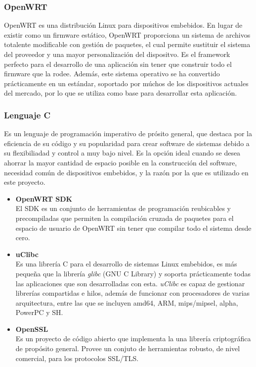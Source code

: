 \documentclass[12pt]{article}
\begin{document}
        \subsubsection{OpenWRT}
            OpenWRT es una distribución Linux para dispositivos embebidos. En lugar de existir como un firmware estático, OpenWRT proporciona un sistema de archivos totalente modificable con gestión de paquetes, el cual permite sustituir el sistema del proveedor y una mayor personalización del dispositvo. Es el framework perfecto para el desarrollo de una aplicación sin tener que construir todo el firmware que la rodee. Además, este sistema operativo se ha convertido prácticamente en un estándar, soportado por múchos de los dispositivos actuales del mercado, por lo que se utiliza como base para desarrollar esta aplicación.

        \subsubsection{Lenguaje C}
            Es un lenguaje de programación imperativo de prósito general, que destaca por la eficiencia de su código y su popularidad para crear software de sistemas debido a su flexibiliadad y control a muy bajo nivel. Es la opción ideal cuando se desea ahorrar la mayor cantidad de espacio posible en la construcción del software, necesidad común de dispositivos embebidos, y la razón por la que es utilizado en este proyecto.

            \begin{itemize}
                \item \textbf{OpenWRT SDK} \\
                El SDK es un conjunto de herramientas de programación reubicables y precompiladas que permiten la compilación cruzada de paquetes para el espacio de usuario de OpenWRT sin tener que compilar todo el sistema desde cero.

                \item \textbf{uClibc} \\
                    Es una librería C para el desarrollo de sistemas Linux embebidos, es más pequeña que la librería \textit{glibc} (GNU C Library) y soporta prácticamente todas las aplicaciones que son desarrolladas con esta. \textit{uClibc} es capaz de gestionar librerías compartidas e hilos, además de funcionar con procesadores de varias arquitectura, entre las que se incluyen amd64, ARM, mips/mipsel, alpha, PowerPC y SH.

                \item \textbf{OpenSSL} \\
                    Es un proyecto de código abierto que implementa la una librería criptográfica de propósito general. Provee un conjuto de herramientas robusto, de nivel comercial, para los protocolos SSL/TLS.
            \end{itemize}
            
\end{document}
